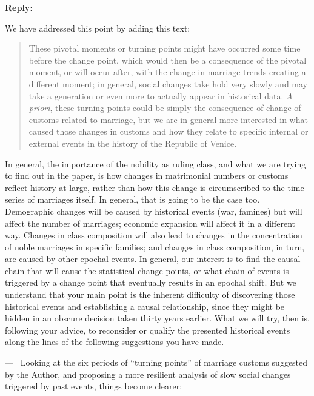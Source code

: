 \documentclass[11pt]{article}
\newcounter{reviewer}
\newcounter{point}[reviewer]
\renewcommand{\thepoint}{P\,\thereviewer.\arabic{point}}
\newenvironment{point}
   {\refstepcounter{point} \bigskip \noindent {\textbf{Reviewer~Point~\thepoint} } ---\ }
   {\par }
\newenvironment{reply}
   {\medskip \noindent \begin{sf}\textbf{Reply}:\  }
   {\medskip \end{sf}}
\begin{document}
\begin{reply}

  We have addressed this point by adding this text:
  \begin{quote}
    These pivotal moments or turning points might have occurred some time before the change point, which would then be a consequence of the pivotal moment, or will occur after, with the change in marriage trends creating a different moment; in general, social changes take hold very slowly and may take a generation or even more to actually appear in historical data. {\em A priori}, these turning points could be simply the consequence of change of customs related to marriage, but we are in general more interested in what caused those changes in customs and how they relate to specific internal or external events in the history of the Republic of Venice.
  \end{quote}

  In general, the importance of the nobility as ruling class, and what we are
  trying to find out in the paper, is how changes in matrimonial numbers or
  customs reflect history at large, rather than how this change is circumscribed
  to the time series of marriages itself. In general, that is going to be the
  case too. Demographic changes will be caused by historical events (war,
  famines) but will affect the number of marriages; economic expansion will
  affect it in a different way. Changes in class composition will also lead to
  changes in the concentration of noble marriages in specific families; and
  changes in class composition, in turn, are caused by other epochal events. In
  general, our interest is to find the causal chain that will cause the
  statistical change points, or what chain of events is triggered by a change
  point that eventually results in an epochal shift. But we understand that your
  main point is the inherent difficulty of discovering those historical events
  and establishing a causal relationship, since they might be hidden in an
  obscure decision taken thirty years earlier. What we will try, then is,
  following your advice, to reconsider or qualify the presented historical
  events along the lines of the following suggestions you have made.
\end{reply}

\begin{point}
  Looking at the six periods of “turning points” of marriage customs suggested
  by the Author, and proposing a more resilient analysis of slow social changes
  triggered by past events, things become clearer:
\end{point}
\end{document}
